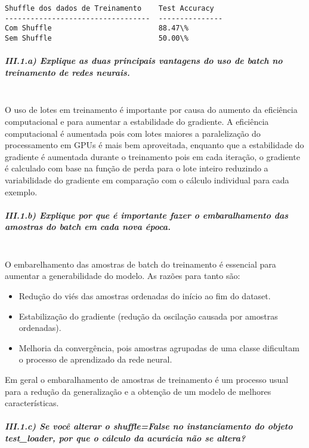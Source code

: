 \documentclass[11pt]{article}
\providecommand{\tightlist}{%
      \setlength{\itemsep}{0pt}\setlength{\parskip}{0pt}}
\begin{document}
    \begin{Verbatim}[commandchars=\\\{\}]
Shuffle dos dados de Treinamento    Test Accuracy
----------------------------------  ---------------
Com Shuffle                         88.47\%
Sem Shuffle                         50.00\%
    \end{Verbatim}

    \subparagraph{III.1.a) Explique as duas principais vantagens do uso de
batch no treinamento de redes
neurais.}\label{iii.1.a-explique-as-duas-principais-vantagens-do-uso-de-batch-no-treinamento-de-redes-neurais.}\mbox{} \\

O uso de lotes em treinamento é importante por causa do aumento da
eficiência computacional e para aumentar a estabilidade do gradiente. A
eficiência computacional é aumentada pois com lotes maiores a
paralelização do processamento em GPUs é mais bem aproveitada, enquanto
que a estabilidade do gradiente é aumentada durante o treinamento pois
em cada iteração, o gradiente é calculado com base na função de perda
para o lote inteiro reduzindo a variabilidade do gradiente em comparação
com o cálculo individual para cada exemplo.

\subparagraph{III.1.b) Explique por que é importante fazer o
embaralhamento das amostras do batch em cada nova
época.}\label{iii.1.b-explique-por-que-uxe9-importante-fazer-o-embaralhamento-das-amostras-do-batch-em-cada-nova-uxe9poca.}\mbox{} \\

O embarelhamento das amostras de batch do treinamento é essencial para
aumentar a generabilidade do modelo. As razões para tanto são:

\begin{itemize}
\tightlist
\item
  Redução do viés das amostras ordenadas do início ao fim do dataset.
\item
  Estabilização do gradiente (redução da oscilação causada por amostras
  ordenadas).
\item
  Melhoria da convergência, pois amostras agrupadas de uma classe
  dificultam o processo de aprendizado da rede neural.
\end{itemize}

Em geral o embaralhamento de amostras de treinamento é um processo usual
para a redução da generalização e a obtenção de um modelo de melhores
características.

\subparagraph{III.1.c) Se você alterar o shuffle=False no instanciamento
do objeto test\_loader, por que o cálculo da acurácia não se
altera?}\label{iii.1.c-se-vocuxea-alterar-o-shufflefalse-no-instanciamento-do-objeto-test_loader-por-que-o-cuxe1lculo-da-acuruxe1cia-nuxe3o-se-altera}\mbox{} \\
\end{document}
